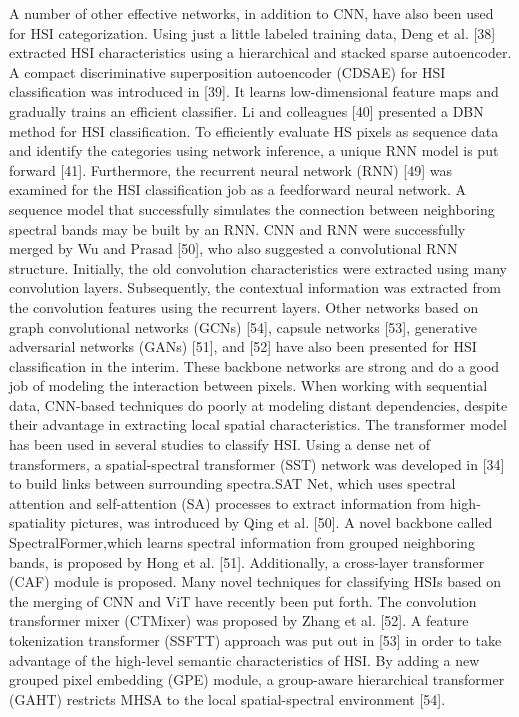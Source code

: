 \documentclass[]{interact}
\theoremstyle{plain}%
\theoremstyle{definition}
\theoremstyle{remark}
\begin{document}
A number of other effective networks, in addition to CNN, have also been used for HSI categorization. Using just a little labeled training data, Deng et al. [38] extracted HSI characteristics using a hierarchical and stacked sparse autoencoder. A compact discriminative superposition autoencoder (CDSAE) for HSI classification was introduced in [39]. It learns low-dimensional feature maps and gradually trains an efficient classifier. Li and colleagues [40] presented a DBN method for HSI classification. To efficiently evaluate HS pixels as sequence data and identify the categories using network inference, a unique RNN model is put forward [41]. Furthermore, the recurrent neural network (RNN) [49] was examined for the HSI classification job as a feedforward neural network. A sequence model that successfully simulates the connection between neighboring spectral bands may be built by an RNN. CNN and RNN were successfully merged by Wu and Prasad [50], who also suggested a convolutional RNN structure. Initially, the old convolution characteristics were extracted using many convolution layers. Subsequently, the contextual information was extracted from the convolution features using the recurrent layers. Other networks based on graph convolutional networks (GCNs) [54], capsule networks [53], generative adversarial networks (GANs) [51], and [52] have also been presented for HSI classification in the interim. These backbone networks are strong and do a good job of modeling the interaction between pixels. When working with sequential data, CNN-based techniques do poorly at modeling distant dependencies, despite their advantage in extracting local spatial characteristics. The transformer model has been used in several studies to classify HSI. Using a dense net of transformers, a spatial-spectral transformer (SST) network was developed in [34] to build links between surrounding spectra.SAT Net, which uses spectral attention and self-attention (SA) processes to extract information from high-spatiality pictures, was introduced by Qing et al. [50]. A novel backbone called SpectralFormer,which learns spectral information from grouped neighboring bands, is proposed by Hong et al. [51]. Additionally, a cross-layer transformer (CAF) module is proposed. Many novel techniques for classifying HSIs based on the merging of CNN and ViT have recently been put forth. The convolution transformer mixer (CTMixer) was proposed by Zhang et al. [52]. A feature tokenization transformer (SSFTT) approach was put out in [53] in order to take advantage of the high-level semantic characteristics of HSI. By adding a new grouped pixel embedding (GPE) module, a group-aware hierarchical transformer (GAHT) restricts MHSA to the local spatial-spectral environment [54].
\end{document}
